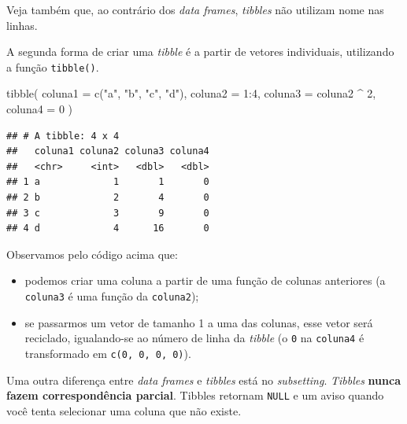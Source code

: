 \documentclass[
]{book}
\newenvironment{Shaded}{\begin{snugshade}}{\end{snugshade}}
\newcommand{\AttributeTok}[1]{\textcolor[rgb]{0.77,0.63,0.00}{#1}}
\newcommand{\CommentTok}[1]{\textcolor[rgb]{0.56,0.35,0.01}{\textit{#1}}}
\newcommand{\DecValTok}[1]{\textcolor[rgb]{0.00,0.00,0.81}{#1}}
\newcommand{\FunctionTok}[1]{\textcolor[rgb]{0.00,0.00,0.00}{#1}}
\newcommand{\NormalTok}[1]{#1}
\newcommand{\SpecialCharTok}[1]{\textcolor[rgb]{0.00,0.00,0.00}{#1}}
\newcommand{\StringTok}[1]{\textcolor[rgb]{0.31,0.60,0.02}{#1}}
\providecommand{\tightlist}{%
  \setlength{\itemsep}{0pt}\setlength{\parskip}{0pt}}
\begin{document}
Veja também que, ao contrário dos \emph{data frames}, \emph{tibbles} não utilizam nome nas linhas.

A segunda forma de criar uma \emph{tibble} é a partir de vetores individuais, utilizando a função \texttt{tibble()}.

\begin{Shaded}
\begin{Highlighting}[]
\FunctionTok{tibble}\NormalTok{(}
  \AttributeTok{coluna1 =} \FunctionTok{c}\NormalTok{(}\StringTok{"a"}\NormalTok{, }\StringTok{"b"}\NormalTok{, }\StringTok{"c"}\NormalTok{, }\StringTok{"d"}\NormalTok{),}
  \AttributeTok{coluna2 =} \DecValTok{1}\SpecialCharTok{:}\DecValTok{4}\NormalTok{,}
  \AttributeTok{coluna3 =}\NormalTok{ coluna2 }\SpecialCharTok{\^{}} \DecValTok{2}\NormalTok{,}
  \AttributeTok{coluna4 =} \DecValTok{0}
\NormalTok{)}
\end{Highlighting}
\end{Shaded}

\begin{verbatim}
## # A tibble: 4 x 4
##   coluna1 coluna2 coluna3 coluna4
##   <chr>     <int>   <dbl>   <dbl>
## 1 a             1       1       0
## 2 b             2       4       0
## 3 c             3       9       0
## 4 d             4      16       0
\end{verbatim}

Observamos pelo código acima que:

\begin{itemize}
\tightlist
\item
  podemos criar uma coluna a partir de uma função de colunas anteriores (a \texttt{coluna3} é uma função da \texttt{coluna2});
\item
  se passarmos um vetor de tamanho 1 a uma das colunas, esse vetor será reciclado, igualando-se ao número de linha da \emph{tibble} (o \texttt{0} na \texttt{coluna4} é transformado em \texttt{c(0,\ 0,\ 0,\ 0)}).
\end{itemize}

Uma outra diferença entre \emph{data frames} e \emph{tibbles} está no \emph{subsetting}. \emph{Tibbles} \textbf{nunca fazem correspondência parcial}. Tibbles retornam \texttt{NULL} e um aviso quando você tenta selecionar uma coluna que não existe.

\begin{Shaded}
\end{Shaded}
\end{document}
